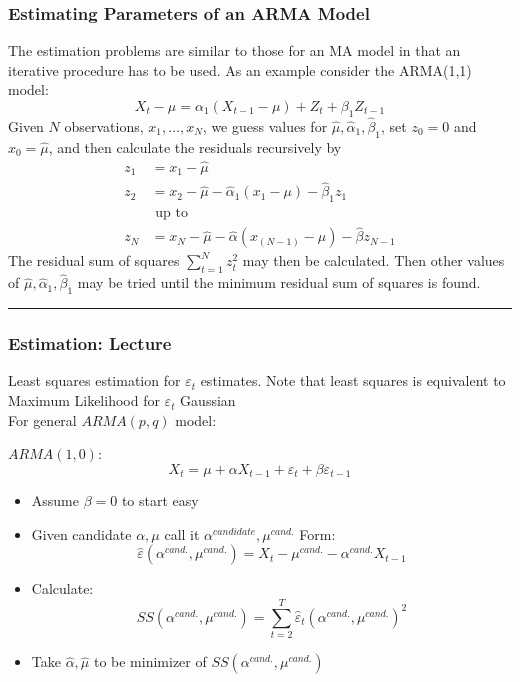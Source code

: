 \subsubsection{Estimating Parameters of an ARMA Model}
The estimation problems are similar to those for an MA model in that an iterative procedure has to be used. As an example consider the ARMA(1,1) model: \[
X_t - \mu = \alpha_1 (X_{t-1}- \mu) + Z_t + \beta_1 Z_{t-1}
\]Given $N$ observations, $x_1, \ldots, x_N$, we guess values for $\hat{\mu}, \hat{\alpha}_1, \hat{\beta}_1 $, set $z_0 = 0$ and $x_0 = \hat{\mu}$, and then calculate the residuals recursively by \begin{align*}
    z_1 &= x_1 - \hat{\mu} \\
    z_2 &= x_2-\hat{\mu} - \hat{\alpha}_1 (x_1-\mu) - \hat{\beta}_1 z_1 \\
    &\text{ up to} \\
    z_N&= x_N - \hat{\mu}- \hat{\alpha}(x_(N-1) -\mu) - \hat{\beta}z_{N-1}
\end{align*}
The residual sum of squares $\sum_{t=1}^N z_t^2$ may then be calculated. Then other values of $\hat{\mu}, \hat{\alpha}_1, \hat{\beta}_1 $ may be tried until the minimum residual sum of squares is found.


\rule{\textwidth}{0.4pt}

\subsubsection{Estimation: Lecture}


Least squares estimation for $\varepsilon_t$ estimates. Note that least squares is equivalent to Maximum Likelihood for $\varepsilon_t$ Gaussian \\

For general $ARMA(p,q)$ model:

$ARMA(1,0)$: \[
X_t=\mu+\alpha X_{t-1} + \varepsilon_t+\beta\varepsilon_{t-1}
\]
\begin{itemize}
    \item Assume $\beta=0$ to start easy
    \item[] Given candidate $\alpha, \mu$ call it $\alpha^{\textit{candidate}}, \mu^{\textit{cand.}}$ Form: \[\hat{\varepsilon}(\alpha^{\textit{cand.}},\mu^{\textit{cand.}}) = X_t -\mu^{\textit{cand.}} - \alpha^{\textit{cand.}}X_{t-1}
    \]
    \item[] Calculate: \[SS(\alpha^{\textit{cand.}},\mu^{\textit{cand.}})=\sum_{t=2}^T \hat{\varepsilon}_t(\alpha^{\textit{cand.}},\mu^{\textit{cand.}} )^2 \]
    \item[] Take $\hat{\alpha}, \hat{\mu}$ to be minimizer of $SS(\alpha^{\textit{cand.}},\mu^{\textit{cand.}})$
\end{itemize}

